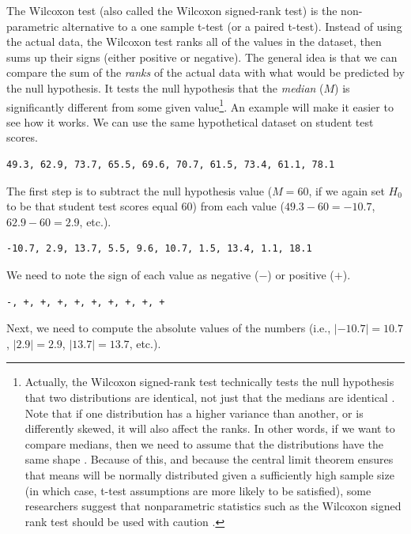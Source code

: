 \documentclass[
]{scrbook}
\begin{document}
The Wilcoxon test (also called the Wilcoxon signed-rank test) is the non-parametric alternative to a one sample t-test (or a paired t-test).
Instead of using the actual data, the Wilcoxon test ranks all of the values in the dataset, then sums up their signs (either positive or negative).
The general idea is that we can compare the sum of the \emph{ranks} of the actual data with what would be predicted by the null hypothesis.
It tests the null hypothesis that the \emph{median} (\(M\)) is significantly different from some given value\footnote{Actually, the Wilcoxon signed-rank test technically tests the null hypothesis that two distributions are identical, not just that the medians are identical \citep{Johnson1995, Lumley2002}. Note that if one distribution has a higher variance than another, or is differently skewed, it will also affect the ranks. In other words, if we want to compare medians, then we need to assume that the distributions have the same shape \citep{Lumley2002}. Because of this, and because the central limit theorem ensures that means will be normally distributed given a sufficiently high sample size (in which case, t-test assumptions are more likely to be satisfied), some researchers suggest that nonparametric statistics such as the Wilcoxon signed rank test should be used with caution \citep{Johnson1995}.}.
An example will make it easier to see how it works.
We can use the same hypothetical dataset on student test scores.

\begin{verbatim}
49.3, 62.9, 73.7, 65.5, 69.6, 70.7, 61.5, 73.4, 61.1, 78.1
\end{verbatim}

The first step is to subtract the null hypothesis value (\(M = 60\), if we again set \(H_{0}\) to be that student test scores equal 60) from each value (\(49.3 - 60 = -10.7\), \(62.9 - 60 = 2.9\), etc.).

\begin{verbatim}
-10.7, 2.9, 13.7, 5.5, 9.6, 10.7, 1.5, 13.4, 1.1, 18.1
\end{verbatim}

We need to note the sign of each value as negative (\(-\)) or positive (\(+\)).

\begin{verbatim}
-, +, +, +, +, +, +, +, +, +
\end{verbatim}

Next, we need to compute the absolute values of the numbers (i.e., \(|-10.7| = 10.7\), \(|2.9| = 2.9\), \(|13.7| = 13.7\), etc.).
\end{document}
